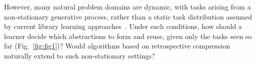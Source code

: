 \documentclass{article}
\begin{document}

However, many natural problem domains are dynamic, with tasks arising from a non-stationary generative process, rather than a static task distribution assumed by current library learning approaches~\citep{bowers2023top,ellis2023dreamcoder}.
Under such conditions, how should a learner decide which abstractions to form and reuse, given only the tasks seen so far (Fig.~\ref{fig:fig1})? 
Would algorithms based on retrospective compression naturally extend to such non-stationary settings?



\end{document}
